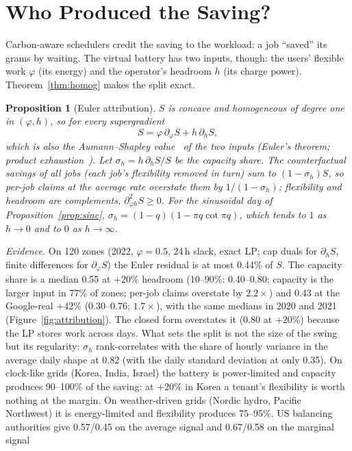 \documentclass[acmsmall,review,anonymous]{acmart}
\newtheorem{proposition}[theorem]{Proposition}
\theoremstyle{definition}
\begin{document}
\section{Who Produced the Saving?}
\label{sec:attribution}
Carbon-aware schedulers credit the saving to the workload: a job ``saved'' its grams by waiting.
The virtual battery has two inputs, though: the users' flexible work $\varphi$ (its energy) and the
operator's headroom $h$ (its charge power). Theorem~\ref{thm:homog} makes the split exact.
\begin{proposition}[Euler attribution]\label{prop:euler}
$S$ is concave and homogeneous of degree one in $(\varphi,h)$, so for every supergradient
\[ S=\varphi\,\partial_\varphi S+h\,\partial_hS, \]
which is also the Aumann--Shapley value~\cite{aumann1974values} of the two inputs (Euler's theorem; product exhaustion~\cite{wicksteed1894an}). Let $\sigma_h=h\,\partial_hS/S$ be the
capacity share. The counterfactual savings of all jobs (each job's flexibility removed in turn)
sum to $(1-\sigma_h)S$, so per-job claims at the average rate overstate them by
$1/(1-\sigma_h)$; flexibility and headroom are complements, $\partial^2_{\varphi h}S\ge0$. For the
sinusoidal day of Proposition~\ref{prop:sinc}, $\sigma_h=(1-q)(1-\pi q\cot\pi q)$, which tends
to $1$ as $h\to0$ and to $0$ as $h\to\infty$.
\end{proposition}
\emph{Evidence.} On 120 zones (2022, $\varphi=0.5$, 24\,h slack, exact LP; cap duals for
$\partial_hS$, finite differences for $\partial_\varphi S$) the Euler residual is at most 0.44\% of
$S$. The capacity share is a median 0.55 at $+20\%$ headroom (10--90\%: 0.40--0.80; capacity is
the larger input in 77\% of zones; per-job claims overstate by $2.2\times$) and 0.43 at the
Google-real $+42\%$ (0.30--0.76; $1.7\times$), with the same medians in 2020 and 2021
(Figure~\ref{fig:attribution}). The closed form overstates it (0.80 at $+20\%$) because the LP
stores work across days. What sets the split is not the size of the swing but its regularity:
$\sigma_h$ rank-correlates with the share of hourly variance in the average daily shape at 0.82
(with the daily standard deviation at only 0.35). On clock-like grids (Korea, India, Israel) the
battery is power-limited and capacity produces 90--100\% of the saving: at $+20\%$ in Korea a
tenant's flexibility is worth nothing at the margin. On weather-driven grids (Nordic hydro,
Pacific Northwest) it is energy-limited and flexibility produces 75--95\%. US balancing
authorities give 0.57/0.45 on the average signal and 0.67/0.58 on the marginal signal
\end{document}
